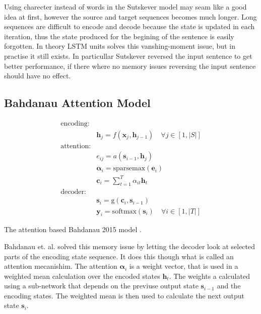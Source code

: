 Using charecter instead of words in the Sutskever model may seam like a good idea at first, however the source and target sequences becomes much longer. Long sequences are difficult to encode and decode because the state is updated in each iteration, thus the state produced for the begining of the sentence is easily forgotten. In theory LSTM units solves this vanshing-moment issue, but in practise it still exists. In particullar Sutskever reversed the input sentence to get better performance, if there where no memory issues reversing the input sentence should have no effect.

\subsection{Bahdanau Attention Model}
\label{sec:theory:sequential:bahdanau}

\begin{equationbox}[H]
\begin{equation*}
\begin{aligned}
\text{encoding:} & \\
& \mathbf{h}_j = f(\mathbf{x}_j, \mathbf{h}_{j-1}) \quad \forall j \in [1, |S|] \\
\text{attention:} & \\
& e_{ij} = a(\mathbf{s}_{i-1}, \mathbf{h}_j) \\
& \bm{\alpha}_i = \mathrm{sparsemax}(\mathbf{e}_i) \\
& \mathbf{c}_i = {\textstyle \sum_{t=1}^T} \alpha_{it} \mathbf{h}_t \\
\text{decoder:} & \\
&\mathbf{s}_i = \mathrm{g}(\mathbf{c}_i, \mathbf{s}_{i-1}) \\
&\mathbf{y}_i = \mathrm{softmax}(\mathbf{s}_i) \quad \forall i \in [1, |T|] 
\end{aligned}
\end{equation*}
\caption{The attention based Bahdanau 2015 model \cite{bahdanau-2015-nmt}.}
\end{equationbox}

Bahdanau et. al. solved this memory issue by letting the decoder look at selected parts of the encoding state sequence. It does this though what is called an attention mecanishim. The attention $\bm{\alpha}_i$ is a weight vector, that is used in a weighted mean calculation over the encoded states $\mathbf{h}_t$. The weights a calculated using a sub-network that depends on the previuse output state $\mathbf{s}_{i-1}$ and the encoding states. The weighted mean is then used to calculate the next output state $\mathbf{s}_{i}$.

